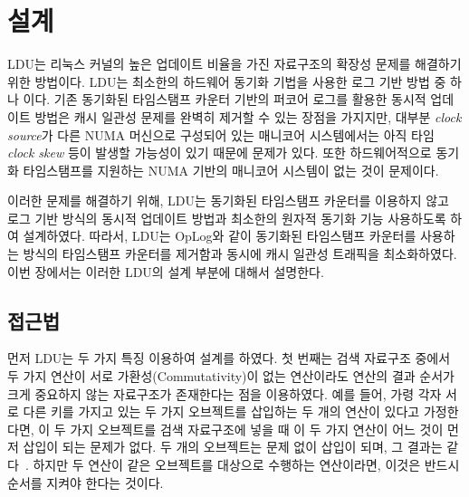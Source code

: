 \section{설계}
\label{sec:ldu}

LDU는 리눅스 커널의 높은 업데이트 비율을 가진 자료구조의 확장성 문제를 해결하기 위한 방법이다.
LDU는 최소한의 하드웨어 동기화 기법을 사용한 로그 기반 방법 중 하나 이다.
기존 동기화된 타임스탬프 카운터 기반의 퍼코어 로그를 활용한 동시적 업데이트 방법은 
캐시 일관성 문제를 완벽히 제거할 수 있는 장점을 가지지만, 
대부분 \textit{clock source}가 다른 NUMA 머신으로 구성되어 있는 매니코어 시스템에서는 
아직 타임 \textit{clock skew} 등이 발생할 가능성이 있기 때문에 문제가 있다.
또한 하드웨어적으로 동기화 타임스탬프를 지원하는 NUMA 기반의 매니코어 시스템이 없는 것이 문제이다.

이러한 문제를 해결하기 위해, LDU는 동기화된 타임스탬프 카운터를 이용하지 않고 로그 기반 방식의 
동시적 업데이트 방법과 최소한의 원자적 동기화 기능 사용하도록 하여 설계하였다.
따라서, LDU는 OpLog와 같이 동기화된 타임스탬프 카운터를 사용하는 방식의 타임스탬프 카운터를 
제거함과 동시에 캐시 일관성 트래픽을 최소화하였다.
이번 장에서는 이러한 LDU의 설계 부분에 대해서 설명한다. 

\subsection{접근법}
먼저 LDU는 두 가지 특징 이용하여 설계를 하였다. 
첫 번째는 검색 자료구조 중에서 두 가지 연산이 서로 가환성(Commutativity)이 없는 연산이라도 
연산의 결과 순서가 크게 중요하지 않는 자료구조가 존재한다는 점을 이용하였다.
예를 들어, 가령 각자 서로 다른 키를 가지고 있는 두 가지 오브젝트를 삽입하는 두 개의 
연산이 있다고 가정한다면, 이 두 가지 오브젝트를 검색 자료구조에 넣을 때 이 두 가지 연산이 
어느 것이 먼저 삽입이 되는 문제가 없다. 
두 개의 오브젝트는 문제 없이 삽입이 되며, 그 결과는 같다~\cite{PaulCreatingAPILWN}. 
하지만 두 연산이 같은 오브젝트를 대상으로 수행하는 연산이라면, 이것은 반드시 
순서를 지켜야 한다는 것이다.  

